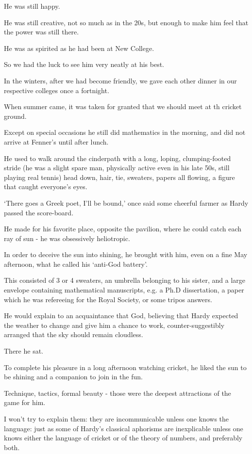 \documentclass{article}
\numberwithin{equation}{section}
\begin{document}
He was still happy.

He was still creative, not so much as in the 20s, but enough to make him feel that the power was still there.

He was as spirited as he had been at New College.

So we had the luck to see him very neatly at his best.

%
In the winters, after we had become friendly, we gave each other dinner in our respective colleges once a fortnight.

When summer came, it was taken for granted that we should meet at th cricket ground.

Except on special occasions he still did mathematics in the morning, and did not arrive at Fenner's until after lunch.

He used to walk around the cinderpath with a long, loping, clumping-footed stride (he was a slight spare man, physically active even in his late 50s, still playing real tennis) head down, hair, tie, sweaters, papers all flowing, a figure that caught everyone's eyes.

`There goes a Greek poet, I'll be bound,' once said some cheerful farmer as Hardy passed the score-board.

He made for his favorite place, opposite the pavilion, where he could catch each ray of sun - he was obsessively heliotropic.

In order to deceive the sun into shining, he brought with him, even on a fine May afternoon, what he called his `anti-God battery'.

This consisted of 3 or 4 sweaters, an umbrella belonging to his sister, and a large envelope containing mathematical manuscripts, e.g. a Ph.D dissertation, a paper which he was refereeing for the Royal Society, or some tripos answers.

He would explain to an acquaintance that God, believing that Hardy expected the weather to change and give him a chance to work, counter-suggestibly arranged that the sky should remain cloudless.

%
There he sat.

To complete his pleasure in a long afternoon watching cricket, he liked the sun to be shining and a companion to join in the fun.

Technique, tactics, formal beauty - those were the deepest attractions of the game for him.

I won't try to explain them: they are incommunicable unless one knows the language: just as some of Hardy's classical aphorisms are inexplicable unless one knows either the language of cricket or of the theory of numbers, and preferably both.
\end{document}
